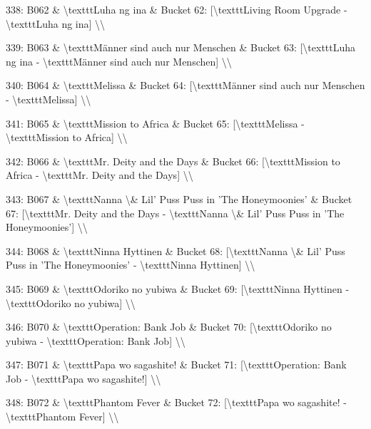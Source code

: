 \documentclass[11pt,a4paper]{article}
\begin{document}
{338: B062 \& \textbackslash{}texttt{Luha ng ina} \& Bucket 62: [\textbackslash{}texttt{Living Room Upgrade} - \textbackslash{}texttt{Luha ng ina}] \textbackslash{}\textbackslash{}

339: B063 \& \textbackslash{}texttt{Männer sind auch nur Menschen} \& Bucket 63: [\textbackslash{}texttt{Luha ng ina} - \textbackslash{}texttt{Männer sind auch nur Menschen}] \textbackslash{}\textbackslash{}

340: B064 \& \textbackslash{}texttt{Melissa} \& Bucket 64: [\textbackslash{}texttt{Männer sind auch nur Menschen} - \textbackslash{}texttt{Melissa}] \textbackslash{}\textbackslash{}

341: B065 \& \textbackslash{}texttt{Mission to Africa} \& Bucket 65: [\textbackslash{}texttt{Melissa} - \textbackslash{}texttt{Mission to Africa}] \textbackslash{}\textbackslash{}

342: B066 \& \textbackslash{}texttt{Mr. Deity and the Days} \& Bucket 66: [\textbackslash{}texttt{Mission to Africa} - \textbackslash{}texttt{Mr. Deity and the Days}] \textbackslash{}\textbackslash{}

343: B067 \& \textbackslash{}texttt{Nanna \textbackslash{}\& Lil' Puss Puss in 'The Honeymoonies'} \& Bucket 67: [\textbackslash{}texttt{Mr. Deity and the Days} - \textbackslash{}texttt{Nanna \textbackslash{}\& Lil' Puss Puss in 'The Honeymoonies'}] \textbackslash{}\textbackslash{}

344: B068 \& \textbackslash{}texttt{Ninna Hyttinen} \& Bucket 68: [\textbackslash{}texttt{Nanna \textbackslash{}\& Lil' Puss Puss in 'The Honeymoonies'} - \textbackslash{}texttt{Ninna Hyttinen}] \textbackslash{}\textbackslash{}

345: B069 \& \textbackslash{}texttt{Odoriko no yubiwa} \& Bucket 69: [\textbackslash{}texttt{Ninna Hyttinen} - \textbackslash{}texttt{Odoriko no yubiwa}] \textbackslash{}\textbackslash{}

346: B070 \& \textbackslash{}texttt{Operation: Bank Job} \& Bucket 70: [\textbackslash{}texttt{Odoriko no yubiwa} - \textbackslash{}texttt{Operation: Bank Job}] \textbackslash{}\textbackslash{}

347: B071 \& \textbackslash{}texttt{Papa wo sagashite!} \& Bucket 71: [\textbackslash{}texttt{Operation: Bank Job} - \textbackslash{}texttt{Papa wo sagashite!}] \textbackslash{}\textbackslash{}

348: B072 \& \textbackslash{}texttt{Phantom Fever} \& Bucket 72: [\textbackslash{}texttt{Papa wo sagashite!} - \textbackslash{}texttt{Phantom Fever}] \textbackslash{}\textbackslash{}

}
\end{document}
